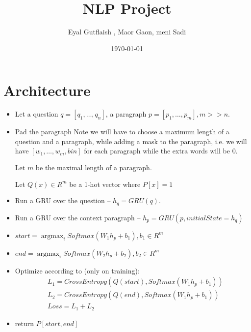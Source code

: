 \documentclass[paper=a4, fontsize=12pt]{scrartcl} %
\title{NLP Project}
\author{Eyal Gutflaish , Maor Gaon, meni Sadi   }
\date{\normalsize\today} %
\DeclareMathOperator*{\argmax}{argmax}
\begin{document}
\maketitle %


 
\section{Architecture}
\begin{itemize}
 
 \item Let a question $q=[q_1,\ldots,q_n]$, a paragraph $p=[p_1,\ldots,p_m], m>>n$.
 \item Pad the paragraph
 Note we will have to choose a maximum length of a question and a paragraph, while adding a mask to the paragraph, i.e.
 we will have $[w_1,\ldots,w_m,bin]$ for each paragraph while the extra words will be 0. 
 
 Let $m$ be the maximal length of a paragraph.
 
 Let $Q(x)\in R^m$ be a 1-hot vector where $P[x]=1$
	\item  Run a GRU over the question -- $h_q=GRU(q)$.
	\item  Run a GRU over the context paragraph -- $h_p=GRU(p,initialState=h_q)$
	\item $start=\argmax_i Softmax(W_1h_p+b_1),b_1\in R^{m}$
	\item $end=\argmax_i Softmax(W_2h_p+b_2),b_2\in R^{m}$
	\item Optimize according to (only on  training):
	\begin{align}
	&L_1=CrossEntropy(Q(start),Softmax(W_1h_p+b_1))\\
	&L_2=CrossEntropy(Q(end),Softmax(W_1h_p+b_1))\\
	&Loss=L_1+L_2
	\end{align}
	\item return $P[start,end]$
	
	\end{itemize}
\end{document}
